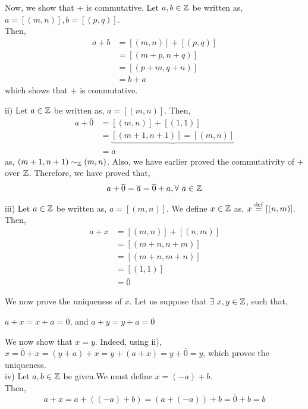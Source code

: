 \documentclass[11pt]{scrartcl}
\begin{document}
 	Now, we show that $+$ is commutative.
 	Let  $a,b \in \mathbb Z$ be written as, $a = [(m,n)], b = [(p,q)]$.\\
 	Then,\\
 	\begin{align*}
 		a+b &= [(m,n)]+[(p,q)]\\
 		&= [(m+p, n+q)]\\
 		&= [(p+m, q+n)]\\
 		&= b+a
 	\end{align*}
 	which shows that $+$ is commutative.
 	
 	ii) Let $a \in \mathbb Z$ be written as, $a = [(m,n)]$. Then,\\
 	\begin{align*}
 		a+\overline{0} &= [(m,n)]+[(1,1)]\\
 		&= \underbrace{[(m+1, n+1)] = [(m,n)]}\\
 		&= \overline{a}
 	\end{align*}
 	as, $(m+1, n+1) \sim_{\mathbb Z} (m,n)$. Also, we have earlier proved the commutativity of $+$ over $\mathbb Z$. Therefore, we have proved that,
 	$$a+\overline{0} = \overline{a} = \overline{0}+a, \forall\ a \in \mathbb Z$$
 	
 	iii) Let $a \in \mathbb Z$ be written as, $a = [(m,n)]$. We define $x \in \mathbb Z$ as, $x \overset{\mathrm{def}}{=} [(n,m)]$.\\
 	Then,\\
 	\begin{align*}
 		a+x &= [(m,n)]+[(n,m)]\\
 		&= [(m+n, n+m)]\\
 		&= [(m+n, m+n)]\\
 		&= [(1,1)]\\
 		&= \overline{0}
 	\end{align*}
 
 	We now prove the uniqueness of $x$. Let us suppose that $\exists\ x,y \in \mathbb Z$, such that,\\
 	\begin{center}
 		$a+x = x+a = \overline{0}$, and $a+y = y+a = \overline{0}$\\
 	\end{center}
 	We now show that $x=y$. Indeed, using ii),\\
 	$x = \overline{0} + x = (y+a) +x = y+(a+x) = y+\overline{0} = y $, which proves the uniqueness.\\[9pt]
 	
 	iv) Let $a,b \in \mathbb Z$ be given.We must define $x = (-a)+b$.\\
 	Then,
 		$$a+x = a+((-a)+b) = (a+(-a))+b = \overline{0}+b = b$$
 		
\end{document}
